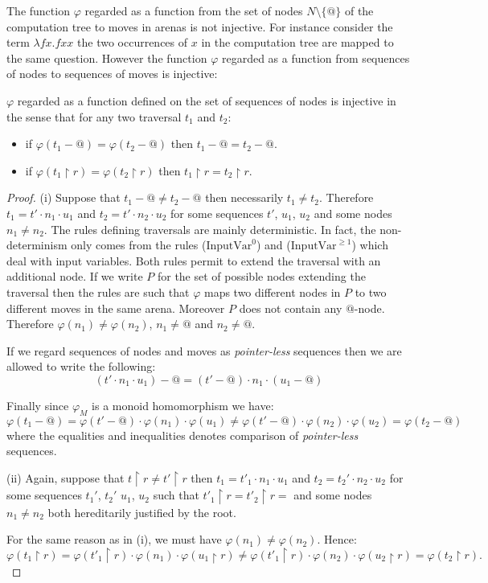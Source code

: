 The function $\varphi$ regarded as a function from the set of nodes $N\setminus\{@\}$ of the computation tree to moves in arenas is not injective.
For instance consider the term $\lambda f x. f x x$ the two occurrences of $x$ in the computation tree are mapped to the same question. However
the function $\varphi$ regarded as a function from sequences of nodes to sequences of moves is injective:
\begin{lem}
$\varphi$ regarded as a function defined on the set of
sequences of nodes is injective in the sense that for any two traversal $t_1$ and $t_2$:
\begin{itemize}
\item[(i)] if $\varphi (t_1 - @ ) = \varphi (t_2 - @ )$ then $t_1-@ =t_2 -@$.
\item[(ii)] if $\varphi (t_1 \upharpoonright r ) = \varphi (t_2 \upharpoonright r )$ then $t_1\upharpoonright r = t_2\upharpoonright r$.
\end{itemize}
\end{lem}
\begin{proof}
(i) Suppose that $t_1-@\neq t_2-@$ then necessarily $t_1 \neq t_2$. Therefore
 $t_1 = t' \cdot n_1 \cdot u_1$ and $t_2 = t' \cdot n_2 \cdot u_2$ for some sequences $t'$, $u_1$, $u_2$
and some nodes $n_1\neq n_2$.
The rules defining traversals are mainly deterministic. In fact, the non-determinism only comes from the rules
($\mbox{InputVar}^0$) and ($\mbox{InputVar}^{\geq 1}$) which deal with input variables. Both rules permit to extend the traversal
with an additional node. If we write $P$ for the set of possible nodes extending the traversal then the rules are such that
$\varphi$ maps two different nodes in $P$ to two different moves in the same arena. Moreover $P$ does not contain any $@$-node.
Therefore $\varphi(n_1) \neq \varphi(n_2)$, $n_1 \neq @$ and $n_2 \neq @$.

If we regard sequences of nodes and moves as \emph{pointer-less} sequences then we are allowed to write the following:
$$ (t' \cdot n_1 \cdot u_1) - @ = (t' - @) \cdot n_1 \cdot (u_1 -@)$$

Finally since $\varphi_M$ is a monoid homomorphism we have:
$$ \varphi(t_1-@) = \varphi(t'-@) \cdot \varphi(n_1) \cdot \varphi(u_1) \neq \varphi(t'-@) \cdot \varphi(n_2) \cdot \varphi(u_2) = \varphi(t_2-@) $$
where the equalities and inequalities denotes comparison of \emph{pointer-less} sequences.

(ii) Again, suppose that $t \upharpoonright r \neq t' \upharpoonright r$ then
 $t_1 = t'_1 \cdot n_1 \cdot u_1$ and $t_2 = t_2' \cdot n_2 \cdot u_2$ for some sequences $t_1'$, $t_2'$ $u_1$, $u_2$
 such that $t'_1 \upharpoonright r = t'_2 \upharpoonright r = $
and some nodes $n_1 \neq n_2$ both hereditarily justified by the root.

For the same reason as in (i), we must have $\varphi(n_1) \neq \varphi(n_2)$. Hence:
$$ \varphi(t_1\upharpoonright r) =
        \varphi(t'_1\upharpoonright r) \cdot \varphi(n_1) \cdot \varphi(u_1 \upharpoonright r)
    \neq \varphi(t'_1\upharpoonright r) \cdot \varphi(n_2) \cdot \varphi(u_2 \upharpoonright r)
         = \varphi(t_2\upharpoonright r).$$
\end{proof}


